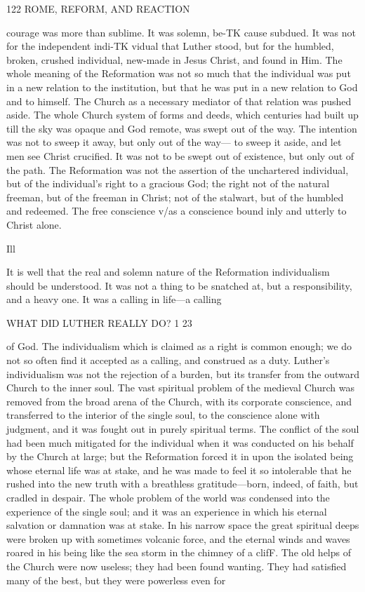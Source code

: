 \documentclass[12pt,a5paper,twoside]{book}
\begin{document}
122 ROME, REFORM, AND REACTION 

courage was more than sublime. It was solemn, be-TK
cause subdued. It was not for the independent indi-TK
vidual that Luther stood, but for the humbled, broken, 
crushed individual, new-made in Jesus Christ, and 
found in Him. The whole meaning of the Reformation 
was not so much that the individual was put in a new 
relation to the institution, but that he was put in a 
new relation to God and to himself. The Church as a 
necessary mediator of that relation was pushed aside. 
The whole Church system of forms and deeds, which 
centuries had built up till the sky was opaque and God 
remote, was swept out of the way. The intention 
was not to sweep it away, but only out of the way---
to sweep it aside, and let men see Christ crucified. It 
was not to be swept out of existence, but only out of 
the path. The Reformation was not the assertion of 
the unchartered individual, but of the individual's right 
to a gracious God; the right not of the natural freeman, 
but of the freeman in Christ; not of the stalwart, but 
of the humbled and redeemed. The free conscience v/as 
a conscience bound inly and utterly to Christ alone. 

Ill 

It is well that the real and solemn nature of the 
Reformation individualism should be understood. It 
was not a thing to be snatched at, but a responsibility, 
and a heavy one. It was a calling in life---a calling 



WHAT DID LUTHER REALLY DO? 1 23 

of God. The individualism which is claimed as a 
right is common enough; we do not so often find 
it accepted as a calling, and construed as a duty. 
Luther's individualism was not the rejection of a 
burden, but its transfer from the outward Church to 
the inner soul. The vast spiritual problem of the 
medieval Church was removed from the broad arena 
of the Church, with its corporate conscience, and 
transferred to the interior of the single soul, to the 
conscience alone with judgment, and it was fought out 
in purely spiritual terms. The conflict of the soul had 
been much mitigated for the individual when it was 
conducted on his behalf by the Church at large; but 
the Reformation forced it in upon the isolated being 
whose eternal life was at stake, and he was made to 
feel it so intolerable that he rushed into the new truth 
with a breathless gratitude---born, indeed, of faith, but 
cradled in despair. The whole problem of the world 
was condensed into the experience of the single soul; 
and it was an experience in which his eternal salvation 
or damnation was at stake. In his narrow space the 
great spiritual deeps were broken up with sometimes 
volcanic force, and the eternal winds and waves roared 
in his being like the sea storm in the chimney of a 
clifF. The old helps of the Church were now useless; 
they had been found wanting. They had satisfied 
many of the best, but they were powerless even for 
\end{document}

